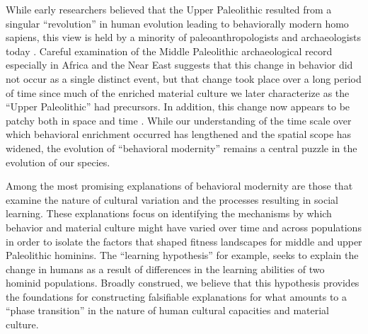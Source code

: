\documentclass[graybox,natbib]{svmult}
\begin{document}
While early researchers believed that the Upper Paleolithic resulted
from a singular ``revolution'' in human evolution leading to
behaviorally modern homo sapiens, this view is held by a minority of
paleoanthropologists and archaeologists today
\citep[e.g.,][]{klein2009human}. Careful examination of the Middle
Paleolithic archaeological record especially in Africa and the Near East
suggests that this change in behavior did not occur as a single distinct
event, but that change took place over a long period of time since much
of the enriched material culture we later characterize as the ``Upper
Paleolithic'' had precursors. In addition, this change now appears to be
patchy both in space and time
\citep{bouzouggar200782, d2007additional, d2011evolution, guy2005mosaic, mcbrearty2000revolution, mcbrearty2007down}.
While our understanding of the time scale over which behavioral
enrichment occurred has lengthened and the spatial scope has widened,
the evolution of ``behavioral modernity'' remains a central puzzle in
the evolution of our species.

Among the most promising explanations of behavioral modernity are those
that examine the nature of cultural variation and the processes
resulting in social learning. These explanations focus on identifying
the mechanisms by which behavior and material culture might have varied
over time and across populations in order to isolate the factors that
shaped fitness landscapes for middle and upper Paleolithic hominins. The
``learning hypothesis'' \citep{Nishiaki2013Introduction} for example,
seeks to explain the change in humans as a result of differences in the
learning abilities of two hominid populations. Broadly construed, we
believe that this hypothesis provides the foundations for constructing
falsifiable explanations for what amounts to a ``phase transition'' in
the nature of human cultural capacities and material culture.
\end{document}

